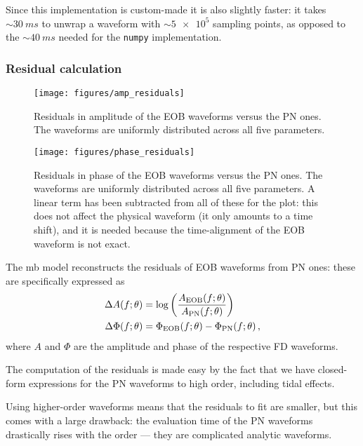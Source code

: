 \documentclass[main.tex]{subfiles}
\begin{document}
Since this implementation is custom-made it is also slightly faster: it takes \(\sim \SI{30}{ms}\) to unwrap a waveform with \(\sim \num{5e5}\) sampling points,  as opposed to the \(\sim \SI{40}{ms}\) needed for the \texttt{numpy} implementation. 

\subsubsection{Residual calculation} \label{sec:residuals}

\begin{figure}[ht]
\centering
\texttt{[image: figures/amp\_residuals]}
\caption{Residuals in amplitude of the EOB waveforms versus the \ac{PN} ones. The waveforms are uniformly distributed across all five parameters. }
\label{fig:amp_residuals}
\end{figure}

\begin{figure}[ht]
\centering
\texttt{[image: figures/phase\_residuals]}
\caption{Residuals in phase of the \ac{EOB} waveforms versus the \ac{PN} ones. The waveforms are uniformly distributed across all five parameters.
A linear term has been subtracted from all of these for the plot: this does not affect the physical waveform (it only amounts to a time shift), and it is needed because the time-alignment of the \ac{EOB} waveform is not exact.}
\label{fig:phase_residuals}
\end{figure}

The \ac{mb} model reconstructs the residuals of \ac{EOB} waveforms from \ac{PN} ones: these are specifically expressed as 
%
\begin{align} \label{eq:amplitude-phase-residuals}
\Delta A(f;\theta ) &= \log \qty(\frac{A _{\text{EOB}} (f;\theta )}{A _{\text{PN}} (f;\theta )}) \\
\Delta \Phi (f; \theta ) &= \Phi _{\text{EOB}} (f; \theta ) - \Phi _{\text{PN}} (f; \theta )
\,,
\end{align}
%
where \(A\) and \(\Phi \) are the amplitude and phase of the respective \ac{FD} waveforms. 

The computation of the residuals is made easy by the fact that we have closed-form expressions for the \ac{PN} waveforms to high order, including tidal effects.

Using higher-order waveforms means that the residuals to fit are smaller, but this comes with a large drawback: the evaluation time of the \ac{PN} waveforms drastically rises with the order --- they are complicated analytic waveforms. 
\end{document}
